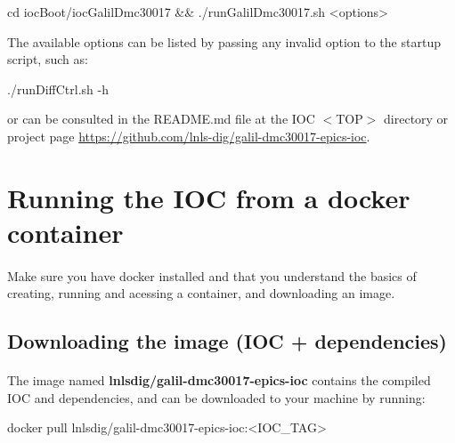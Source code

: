 \documentclass[openany]{article}
\begin{document}
        \vspace{1mm}
        \begin{code}
cd iocBoot/iocGalilDmc30017 &&
./runGalilDmc30017.sh <options>
        \end{code}
        \vspace{1mm}

    The available options can be listed by passing any invalid option to the startup script, such as:

        \vspace{1mm}
        \begin{code}
./runDiffCtrl.sh -h
        \end{code}
        \vspace{1mm}

    or can be consulted in the README.md file at the IOC $<$TOP$>$ directory or project page \url{https://github.com/lnls-dig/galil-dmc30017-epics-ioc}.

\section{Running the IOC from a docker container}\label{sec:run-with-docker}

    \paragraph{} Make sure you have docker installed and that you understand the basics of creating, running and acessing a container, and downloading an image.

    \subsection{Downloading the image (IOC + dependencies)}

        \paragraph{} The image named \textbf{lnlsdig/galil-dmc30017-epics-ioc} contains the compiled IOC and dependencies, and can be downloaded to your machine by running:

        \vspace{1mm}
        \begin{code}
docker pull lnlsdig/galil-dmc30017-epics-ioc:<IOC_TAG>
        \end{code}
        \vspace{1mm}
\end{document}
